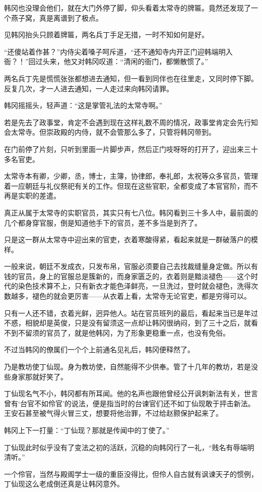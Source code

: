 韩冈也没理会他们，就在大门外停了脚，仰头看着太常寺的牌匾。竟然还发现了一个燕子窝，真是离谱到了极点。

见韩冈抬头只顾着牌匾，两名兵丁手足无措，一时不知如何是好。

“还傻站着作甚？”内侍尖着嗓子呵斥道，“还不通知寺内开正门迎韩端明入衙？！”回过头来，他又对韩冈叹道：“清闲的衙门，都懒散惯了。”

两名兵丁先是慌慌张张都想进去通知，但一看到同伴也在往里走，又同时停下脚。反复几次，才一人进去通知，一人走过来向韩冈请罪。

韩冈摇摇头，轻声道：“这是掌管礼法的太常寺啊。”

若是先去了政事堂，肯定不会遇到现在这样礼数不周的情况，政事堂肯定会先行知会太常寺。但崇政殿的内侍，就不会管那么多了，只管将韩冈带到。

在门前停了片刻，只听到里面一片脚步声，然后正门吱呀呀的打开了，迎出来三十多名官吏。

太常寺本有卿，少卿，丞，博士，主簿，协律郎，奉礼郎，太祝等众多官员，管理着一应朝廷与礼仪祭祀有关的工作。但现在这些官职，全都变成了本官官阶，而不再是实职的差遣。

真正从属于太常寺的实职官员，其实只有七八位。韩冈看到三十多人中，最前面的几个都身穿官服，倒是知道他手下的官员，差不多当是到齐了。

只是这一群从太常寺中迎出来的官吏，衣着寒酸得紧，看起来就是一群破落户的模样。

一般来说，朝廷不发成衣，只发布帛，官服必须要自己去找裁缝量身定做。所以有钱的官员，身上的官服总是簇新的，而身家匮乏的，衣着则是黯淡褪色——这个时代的染色技术算不上，只有新衣才能色泽鲜亮，一旦洗过，登时就会褪色，洗得次数越多，褪色的就会更厉害——从衣着上看，太常寺无论官吏，都是穷得可以。

只有一人还不错，衣着光鲜，迥异他人。站在官员班列的最后，看起来当已是年过不惑，相貌却是英俊，只是没有留须这一点却让韩冈很纳闷，到了三十之后，就看不到不留须的官员了，就是他韩冈，为了形象更稳重一点，也没有免俗。

不过当韩冈的僚属们一个个上前通名见礼后，韩冈便释然了。

乃是教坊使丁仙现。身为教坊使，自然能得不少供奉。管了十几年的教坊，若是没些身家那就好笑了。

丁仙现名气不小，韩冈都有所耳闻。他的名声也跟他曾经公开讽刺新法有关，世言曾有‘台官不如伶官’的说法，便是指当时的台谏官们还不如丁仙现敢于抨击新法。王安石甚至被气得火冒三丈，想要将他治罪，不过给赵颢保护起来了。

韩冈上下一打量：“丁仙现？那就是传闻中的丁使了。”

丁仙现此时似乎没有了变法之初的活跃，沉稳的向韩冈行了一礼，“贱名有辱端明清听。”

一个伶官，当然与殿阁学士一级的重臣没得比，但伶人自古就有讽谏天子的惯例，丁仙现这么老成倒还真是让韩冈意外。
